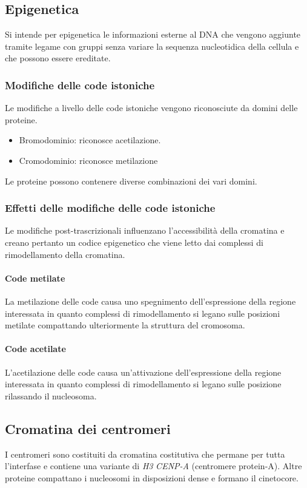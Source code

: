 	\subsection{Epigenetica}
	Si intende per epigenetica le informazioni esterne al DNA che vengono aggiunte tramite legame con gruppi senza variare la sequenza nucleotidica della cellula e che possono essere ereditate.

		\subsubsection{Modifiche delle code istoniche}
		Le modifiche a livello delle code istoniche vengono riconosciute da domini delle proteine.
		\begin{multicols}{2}
			\begin{itemize}
				\item Bromodominio: riconosce acetilazione.
				\item Cromodominio: riconosce metilazione
			\end{itemize}
		\end{multicols}
		Le proteine possono contenere diverse combinazioni dei vari domini.

		\subsubsection{Effetti delle modifiche delle code istoniche}
		Le modifiche post-trascrizionali influenzano l'accessibilit\`a della cromatina e creano pertanto un codice epigenetico che viene letto dai complessi di rimodellamento della cromatina.
			
			\paragraph{Code metilate}
			La metilazione delle code causa uno spegnimento dell'espressione della regione interessata in quanto complessi di rimodellamento si legano sulle posizioni metilate compattando ulteriormente la struttura del cromosoma.

			\paragraph{Code acetilate}
			L'acetilazione delle code causa un'attivazione dell'espressione della regione interessata in quanto complessi di rimodellamento si legano sulle posizione rilassando il nucleosoma.

	\subsection{Cromatina dei centromeri}
	I centromeri sono costituiti da cromatina costitutiva che permane per tutta l'interfase e contiene una variante di \emph{H3} \emph{CENP-A} (centromere protein-A).
	Altre proteine compattano i nucleosomi in disposizioni dense e formano il cinetocore.

